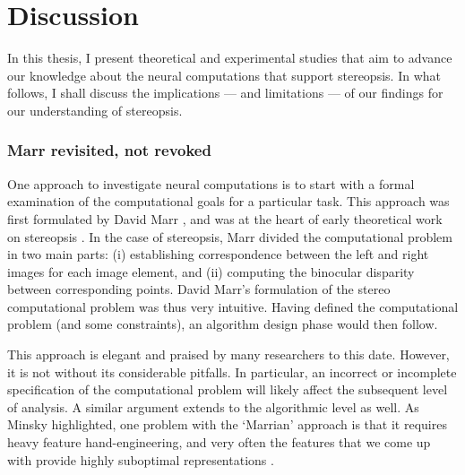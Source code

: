 \def\baselinestretch{1}
\chapter{Discussion}
\ifpdf
    \graphicspath{{discussion/discussion-figs/PNG/}{discussion/discussion-figs/PDF/}{discussion/discussion-figs/}}
\else
    \graphicspath{{discussion/discussion-figs/EPS/}{discussion/discussion-figs/}}
\fi

\def\baselinestretch{1.66}

In this thesis, I present theoretical and experimental studies that aim to advance our knowledge about the neural computations that support stereopsis. In what follows, I shall discuss the implications --- and limitations --- of our findings for our understanding of stereopsis.

\subsection*{Marr revisited, not revoked}

One approach to investigate neural computations is to start with a formal examination of the computational goals for a particular task. This approach was first formulated by David Marr \cite{Marr:1976dq,Marr:1982:VCI:1095712}, and was at the heart of early theoretical work on stereopsis \cite{Sperling:1970ys,Marr:1976dq}. In the case of stereopsis, Marr divided the computational problem in two main parts: (i) establishing correspondence between the left and right images for each image element, and (ii) computing the binocular disparity between corresponding points. David Marr's formulation of the stereo computational problem was thus very intuitive. Having defined the computational problem (and some constraints), an algorithm design phase would then follow.

This approach is elegant and praised by many researchers to this date. However, it is not without its considerable pitfalls. In particular, an incorrect or incomplete specification of the computational problem will likely affect the subsequent level of analysis. A similar argument extends to the algorithmic level as well. As Minsky highlighted, one problem with the `Marrian' approach is that it requires heavy feature hand-engineering, and very often the features that we come up with provide highly suboptimal representations \cite{Stork:1996:HLC:548366}.

